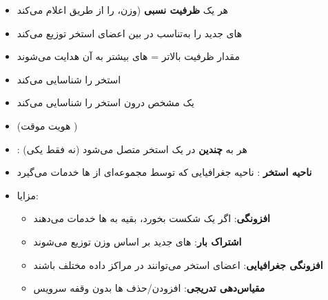 
\begin{itemize}
\tightlist
\item
  هر  یک \textbf{ظرفیت نسبی } (وزن،  را از طریق  اعلام می‌کند
\item
  های جدید را به‌تناسب در بین اعضای استخر توزیع می‌کند
\item
  مقدار ظرفیت بالاتر = های بیشتر به آن  هدایت می‌شوند
\end{itemize}



\begin{itemize}
\tightlist
\item
   استخر  را شناسایی می‌کند
\item
   یک  مشخص درون استخر را شناسایی می‌کند
\item
   (هویت موقت )
\end{itemize}



\CNchained{}

\begin{itemize}
\tightlist
\item
  : هر  به \textbf{چندین } در یک استخر متصل می‌شود (نه فقط یکی)
\item
  \textbf{ناحیه استخر }: ناحیه جغرافیایی که توسط مجموعه‌ای از ها خدمات می‌گیرد
\item
  مزایا:

  \begin{itemize}
  \tightlist
  \item
    \textbf{افزونگی}: اگر یک  شکست بخورد، بقیه به ها خدمات می‌دهند
  \item
    \textbf{اشتراک بار}: های جدید بر اساس وزن توزیع می‌شوند
  \item
    \textbf{افزونگی جغرافیایی}: اعضای استخر می‌توانند در مراکز داده مختلف باشند
  \item
    \textbf{مقیاس‌دهی تدریجی}: افزودن/\allowbreak{}حذف ها بدون وقفه سرویس
  \end{itemize}
\end{itemize}

